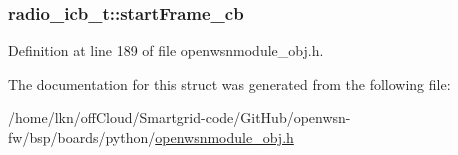 \subsubsection[{\texorpdfstring{start\+Frame\+\_\+cb}{startFrame_cb}}]{ radio\+\_\+icb\+\_\+t\+::start\+Frame\+\_\+cb}\hypertarget{structradio__icb__t_a6c560d42a7816513fc7dfcb04d5cc13a}{}\label{structradio__icb__t_a6c560d42a7816513fc7dfcb04d5cc13a}


Definition at line 189 of file openwsnmodule\+\_\+obj.\+h.



The documentation for this struct was generated from the following file\+:\begin{DoxyCompactItemize}
\item 
/home/lkn/off\+Cloud/\+Smartgrid-\/code/\+Git\+Hub/openwsn-\/fw/bsp/boards/python/\hyperlink{openwsnmodule__obj_8h}{openwsnmodule\+\_\+obj.\+h}\end{DoxyCompactItemize}
